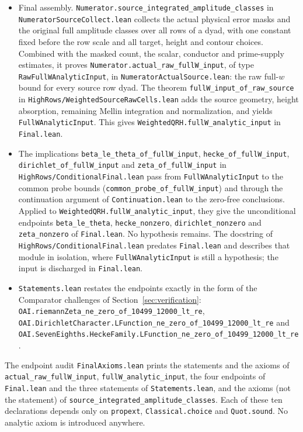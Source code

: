 \documentclass[11pt]{article}
\begin{document}
\begin{itemize}
\nolinkurl{HighRows/CubeFullWNormalized.lean}. The endpoint integration
theorem is \nolinkurl{FullWContour.finiteFullW_uniform_norm_bound}.
\item Final assembly.
\nolinkurl{Numerator.source_integrated_amplitude_classes} in
\nolinkurl{NumeratorSourceCollect.lean} collects the actual physical error
masks and the original full amplitude classes over all rows of a dyad,
with one constant fixed before the row scale and all target, height and
contour choices. Combined with the masked count, the scalar, conductor
and prime-supply estimates, it proves
\nolinkurl{Numerator.actual_raw_fullW_input}, of type
\nolinkurl{RawFullWAnalyticInput}, in
\nolinkurl{NumeratorActualSource.lean}: the raw full-$w$ bound for every
source row dyad. The theorem \nolinkurl{fullW_input_of_raw_source} in
\nolinkurl{HighRows/WeightedSourceRawCells.lean} adds the source geometry,
height absorption, remaining Mellin integration and normalization, and
yields \nolinkurl{FullWAnalyticInput}. This gives
\nolinkurl{WeightedQRH.fullW_analytic_input} in \nolinkurl{Final.lean}.
\item The implications \nolinkurl{beta_le_theta_of_fullW_input},
\nolinkurl{hecke_of_fullW_input}, \nolinkurl{dirichlet_of_fullW_input} and
\nolinkurl{zeta_of_fullW_input} in
\nolinkurl{HighRows/ConditionalFinal.lean} pass from
\nolinkurl{FullWAnalyticInput} to the common probe bounds
(\nolinkurl{common_probe_of_fullW_input}) and through the continuation
argument of \nolinkurl{Continuation.lean} to the zero-free conclusions.
Applied to \nolinkurl{WeightedQRH.fullW_analytic_input}, they give the
unconditional endpoints \nolinkurl{beta_le_theta},
\nolinkurl{hecke_nonzero}, \nolinkurl{dirichlet_nonzero} and
\nolinkurl{zeta_nonzero} of \nolinkurl{Final.lean}. No hypothesis
remains. The docstring of \nolinkurl{HighRows/ConditionalFinal.lean}
predates \nolinkurl{Final.lean} and describes that module in isolation,
where \nolinkurl{FullWAnalyticInput} is still a hypothesis; the input is
discharged in \nolinkurl{Final.lean}.
\item \nolinkurl{Statements.lean} restates the endpoints exactly in the
form of the Comparator challenges of Section~\ref{sec:verification}:
\nolinkurl{OAI.riemannZeta_ne_zero_of_10499_12000_lt_re},
\nolinkurl{OAI.DirichletCharacter.LFunction_ne_zero_of_10499_12000_lt_re}
and
\nolinkurl{OAI.SevenEighths.HeckeFamily.LFunction_ne_zero_of_10499_12000_lt_re}.
\end{itemize}

The endpoint audit \nolinkurl{FinalAxioms.lean} prints the statements
and the axioms of \nolinkurl{actual_raw_fullW_input},
\nolinkurl{fullW_analytic_input}, the four endpoints of
\nolinkurl{Final.lean} and the three statements of
\nolinkurl{Statements.lean}, and the axioms (not the statement) of
\nolinkurl{source_integrated_amplitude_classes}. Each of these ten
declarations depends only on \nolinkurl{propext},
\nolinkurl{Classical.choice} and \nolinkurl{Quot.sound}. No analytic
axiom is introduced anywhere.
\par
\endgroup
\end{document}
